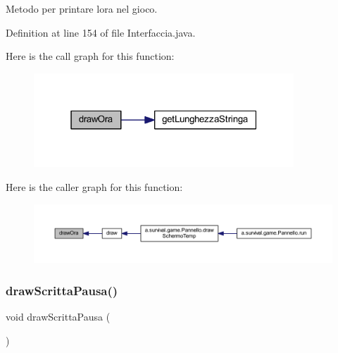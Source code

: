 Metodo per printare l\textquotesingle{}ora nel gioco. 



Definition at line 154 of file Interfaccia.\+java.

Here is the call graph for this function\+:
\nopagebreak
\begin{figure}[H]
\begin{center}
\leavevmode
\includegraphics[width=277pt]{classa_1_1survival_1_1game_1_1_interfaccia_a2dc05af87e20aefac5da3cd184d09456_cgraph}
\end{center}
\end{figure}
Here is the caller graph for this function\+:
\nopagebreak
\begin{figure}[H]
\begin{center}
\leavevmode
\includegraphics[width=350pt]{classa_1_1survival_1_1game_1_1_interfaccia_a2dc05af87e20aefac5da3cd184d09456_icgraph}
\end{center}
\end{figure}
\mbox{\label{classa_1_1survival_1_1game_1_1_interfaccia_a5ea2e0aa29eed2ee8e977ec1495103d3}} 
\subsubsection{\texorpdfstring{draw\+Scritta\+Pausa()}{drawScrittaPausa()}}
{\footnotesize\ttfamily void draw\+Scritta\+Pausa (\begin{DoxyParamCaption}{ }\end{DoxyParamCaption})}



